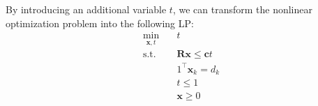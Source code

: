 By introducing an additional variable $t$, we can transform the nonlinear optimization problem into the following LP:
\begin{subequations}
\begin{align}
\min _{\mathbf{x},t} \quad & t \\
\text {s.t.} \quad& \mathbf{R x} \leq \mathbf{c}t\label{eq:2b} \\
& 1^\top \mathbf{x}_{k}=d_{k} \label{eq:2c} \\
& t\leq 1 \label{eq:2d}\\
& \mathbf{x} \geq 0
\end{align}
\end{subequations}





